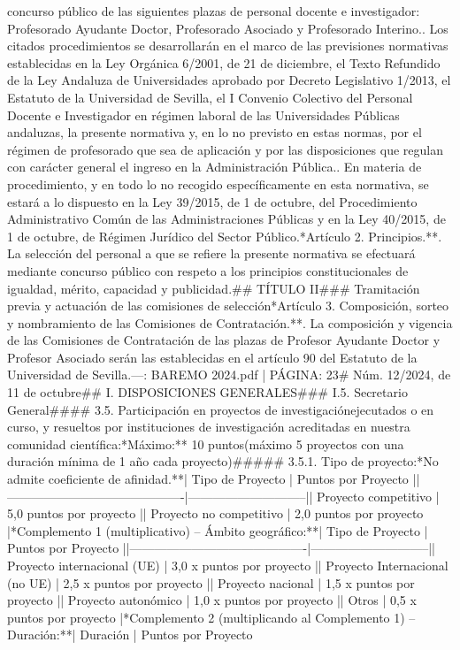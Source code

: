 \documentclass{article}
\begin{document}
\begin{itemize}
concurso público de las siguientes plazas de personal docente e investigador: Profesorado Ayudante Doctor, Profesorado Asociado y Profesorado Interino.. Los citados procedimientos se desarrollarán en el marco de las previsiones normativas establecidas en la Ley Orgánica 6/2001, de 21 de diciembre, el Texto Refundido de la Ley Andaluza de Universidades aprobado por Decreto Legislativo 1/2013, el Estatuto de la Universidad de Sevilla, el I Convenio Colectivo del Personal Docente e Investigador en régimen laboral de las Universidades Públicas andaluzas, la presente normativa y, en lo no previsto en estas normas, por el régimen de profesorado que sea de aplicación y por las disposiciones que regulan con carácter general el ingreso en la Administración Pública.. En materia de procedimiento, y en todo lo no recogido específicamente en esta normativa, se estará a lo dispuesto en la Ley 39/2015, de 1 de octubre, del Procedimiento Administrativo Común de las Administraciones Públicas y en la Ley 40/2015, de 1 de octubre, de Régimen Jurídico del Sector Público.\n\n**Artículo 2. Principios.**\n{}. La selección del personal a que se refiere la presente normativa se efectuará mediante concurso público con respeto a los principios constitucionales de igualdad, mérito, capacidad y publicidad.\n\n## TÍTULO II\n\n### Tramitación previa y actuación de las comisiones de selección\n\n**Artículo 3. Composición, sorteo y nombramiento de las Comisiones de Contratación.**\n{}. La composición y vigencia de las Comisiones de Contratación de las plazas de Profesor Ayudante Doctor y Profesor Asociado serán las establecidas en el artículo 90 del Estatuto de la Universidad de Sevilla.\n\n---\n\nFUENTE: BAREMO 2024.pdf | PÁGINA: 23\n# Núm. 12/2024, de 11 de octubre\n\n## I. DISPOSICIONES GENERALES\n\n### I.5. Secretario General\n\n#### 3.5. Participación en proyectos de investigación\nfinanciados ejecutados o en curso, y resueltos por instituciones de investigación acreditadas en nuestra comunidad científica:\n**Máximo:** 10 puntos\n(máximo 5 proyectos con una duración mínima de 1 año cada proyecto)\n\n##### 3.5.1. Tipo de proyecto:\n**No admite coeficiente de afinidad.**\n\n| Tipo de Proyecto                          | Puntos por Proyecto         |\n|-------------------------------------------|-----------------------------|\n| Proyecto competitivo                       | 5,0 puntos por proyecto      |\n| Proyecto no competitivo                    | 2,0 puntos por proyecto      |\n\n**Complemento 1 (multiplicativo) – Ámbito geográfico:**\n\n| Tipo de Proyecto                          | Puntos por Proyecto         |\n|-------------------------------------------|-----------------------------|\n| Proyecto internacional (UE)               | 3,0 x puntos por proyecto    |\n| Proyecto Internacional (no UE)            | 2,5 x puntos por proyecto    |\n| Proyecto nacional                          | 1,5 x puntos por proyecto    |\n| Proyecto autonómico                        | 1,0 x puntos por proyecto    |\n| Otros                                     | 0,5 x puntos por proyecto    |\n\n**Complemento 2 (multiplicando al Complemento 1) – Duración:**\n\n| Duración                                   | Puntos por Proyecto         
\end{itemize}
\end{document}
